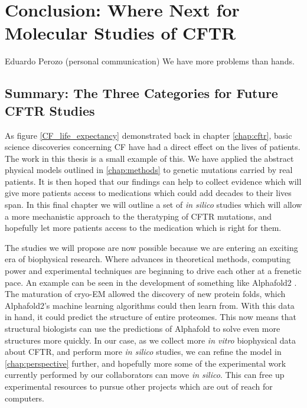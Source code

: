 \chapter{Conclusion: Where Next for Molecular Studies of CFTR}
\label{chap:conclusion}
\begin{chapquote} {Eduardo Perozo (personal communication)}
We have more problems than hands. 
\end{chapquote}


\section{Summary: The Three Categories for Future CFTR Studies}

As figure \ref{CF_life_expectancy} demonstrated back in chapter \ref{chap:cftr}, basic science discoveries concerning CF have had a direct effect on the lives of patients. The work in this thesis is a small example of this. We have applied the abstract physical models outlined in \ref{chap:methods} to genetic mutations carried by real patients. It is then hoped that our findings can help to collect evidence which will give more patients access to medications which could add decades to their lives span. In this final chapter we will outline a set of \textit{in silico} studies which will allow a more mechanistic approach to the theratyping of CFTR mutations, and hopefully let more patients access to the medication which is right for them.  

The studies we will propose are now possible because we are entering an exciting era of biophysical research. Where advances in theoretical methods, computing power and experimental techniques are beginning to drive each other at a frenetic pace. An example can be seen in the development of something like Alphafold2 \cite{jumper2021}. The maturation of cryo-EM allowed the discovery of new protein folds, which Alphafold2's machine learning algorithms could then learn from. With this data in hand, it could predict the structure of entire proteomes. This now means that structural biologists can use the predictions of Alphafold to solve even more structures more quickly. In our case, as we collect more \textit{in vitro} biophysical data about CFTR, and perform more \textit{in silico} studies, we can refine the model in \ref{chap:perspective} further, and hopefully more some of the experimental work currently performed by our collaborators can move \textit{in silico}. This can free up experimental resources to pursue other projects which are out of reach for computers. 

